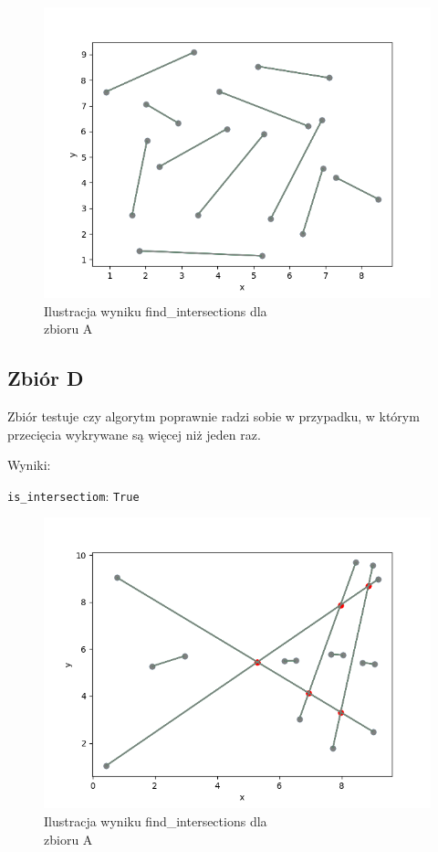 \documentclass[11pt,a4paper]{article}
\begin{document}
\begin{figure}[H]
    \centering
    \includegraphics[scale=0.5]{res/int_c.png}
    \caption{Ilustracja wyniku \ttfamily find\_intersections \normalfont dla \\zbioru A}
\end{figure}

\subsection{Zbiór D}
Zbiór testuje czy algorytm poprawnie radzi sobie w przypadku,
w którym przecięcia wykrywane są więcej niż jeden raz.

Wyniki:

\verb|is_intersectiom|: \verb|True|

\begin{figure}[H]
    \centering 
    \includegraphics[scale=0.5]{res/int_d.png}
    \caption{Ilustracja wyniku \ttfamily find\_intersections \normalfont dla \\zbioru A}
\end{figure}
\end{document}

